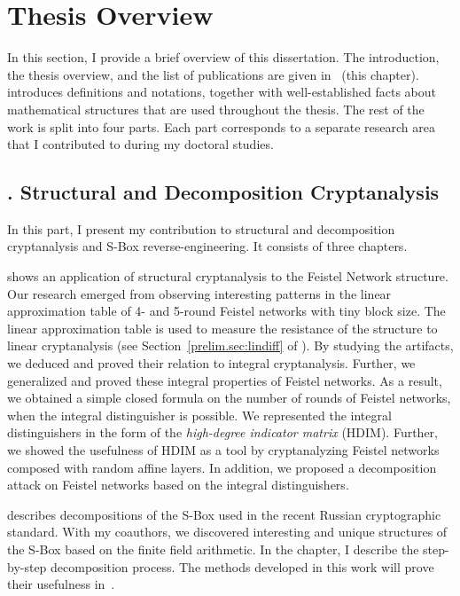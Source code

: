 \section{Thesis Overview}

In this section, I provide a brief overview of this dissertation. The introduction, the thesis overview, and the list of publications are given in~\textbf{} (this chapter). \textbf{} introduces definitions and notations, together with well-established facts about mathematical structures that are used throughout the thesis. The rest of the work is split into four parts. Each part corresponds to a separate research area that I contributed to during my doctoral studies.


\subsection{. Structural and Decomposition Cryptanalysis}

In this part, I present my contribution to structural and decomposition cryptanalysis and S-Box reverse-engineering. It consists of three chapters.

\textbf{} shows an application of structural cryptanalysis to the Feistel Network structure. Our research emerged from observing interesting patterns in the linear approximation table of 4- and 5-round Feistel networks with tiny block size. The linear approximation table is used to measure the resistance of the structure to linear cryptanalysis (see Section~\ref{prelim.sec:lindiff} of ). By studying the artifacts, we deduced and proved their relation to integral cryptanalysis. Further, we generalized and proved these integral properties of Feistel networks. As a result, we obtained a simple closed formula on the number of rounds of Feistel networks, when the integral distinguisher is possible. We represented the integral distinguishers in the form of the \emph{high-degree indicator matrix} (HDIM). Further, we showed the usefulness of HDIM as a tool by cryptanalyzing Feistel networks composed with random affine layers. In addition, we proposed a decomposition attack on Feistel networks based on the integral distinguishers.

\textbf{} describes decompositions of the S-Box used in the recent Russian cryptographic standard. With my coauthors, we discovered interesting and unique structures of the S-Box based on the finite field arithmetic. In the chapter, I describe the step-by-step decomposition process. The methods developed in this work will prove their usefulness in~.

